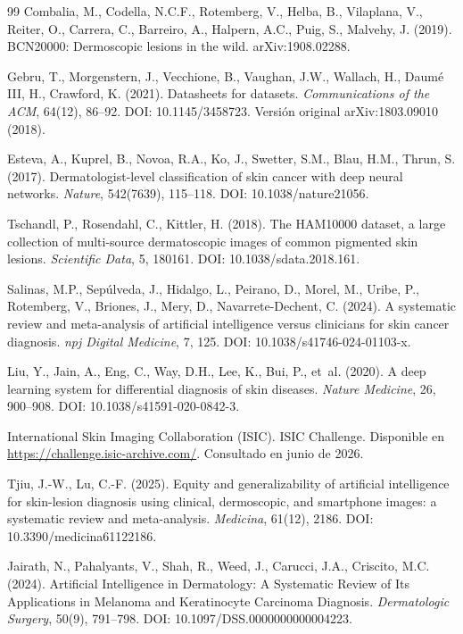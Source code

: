 \begin{thebibliography}{99}
Combalia, M., Codella, N.C.F., Rotemberg, V., Helba, B., Vilaplana, V., Reiter, O., Carrera, C., Barreiro, A., Halpern, A.C., Puig, S., Malvehy, J. (2019). BCN20000: Dermoscopic lesions in the wild. arXiv:1908.02288.

Gebru, T., Morgenstern, J., Vecchione, B., Vaughan, J.W., Wallach, H., Daumé III, H., Crawford, K. (2021). Datasheets for datasets. \emph{Communications of the ACM}, 64(12), 86--92. DOI: 10.1145/3458723. Versión original arXiv:1803.09010 (2018).

Esteva, A., Kuprel, B., Novoa, R.A., Ko, J., Swetter, S.M., Blau, H.M., Thrun, S. (2017). Dermatologist-level classification of skin cancer with deep neural networks. \emph{Nature}, 542(7639), 115--118. DOI: 10.1038/nature21056.

Tschandl, P., Rosendahl, C., Kittler, H. (2018). The HAM10000 dataset, a large collection of multi-source dermatoscopic images of common pigmented skin lesions. \emph{Scientific Data}, 5, 180161. DOI: 10.1038/sdata.2018.161.

Salinas, M.P., Sepúlveda, J., Hidalgo, L., Peirano, D., Morel, M., Uribe, P., Rotemberg, V., Briones, J., Mery, D., Navarrete-Dechent, C. (2024). A systematic review and meta-analysis of artificial intelligence versus clinicians for skin cancer diagnosis. \emph{npj Digital Medicine}, 7, 125. DOI: 10.1038/s41746-024-01103-x.

Liu, Y., Jain, A., Eng, C., Way, D.H., Lee, K., Bui, P., et~al. (2020). A deep learning system for differential diagnosis of skin diseases. \emph{Nature Medicine}, 26, 900--908. DOI: 10.1038/s41591-020-0842-3.

International Skin Imaging Collaboration (ISIC). ISIC Challenge. Disponible en \url{https://challenge.isic-archive.com/}. Consultado en junio de 2026.

Tjiu, J.-W., Lu, C.-F. (2025). Equity and generalizability of artificial intelligence for skin-lesion diagnosis using clinical, dermoscopic, and smartphone images: a systematic review and meta-analysis. \emph{Medicina}, 61(12), 2186. DOI: 10.3390/medicina61122186.

Jairath, N., Pahalyants, V., Shah, R., Weed, J., Carucci, J.A., Criscito, M.C. (2024). Artificial Intelligence in Dermatology: A Systematic Review of Its Applications in Melanoma and Keratinocyte Carcinoma Diagnosis. \emph{Dermatologic Surgery}, 50(9), 791--798. DOI: 10.1097/DSS.0000000000004223.


\end{thebibliography}
